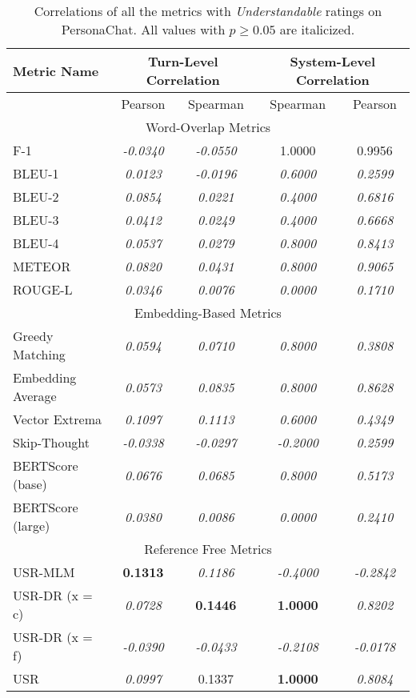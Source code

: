 \documentclass[11pt,a4paper]{article}
\begin{document}
\begin{table*}
    \centering
    \renewcommand*{\arraystretch}{1.2}
    \begin{tabular}{|l|c|c|c|c|}
    \hline
        \textbf{Metric Name} & \multicolumn{2}{|c|}{\textbf{Turn-Level Correlation}} & \multicolumn{2}{|c|}{\textbf{System-Level Correlation}}  \\ \hline
         & Pearson & Spearman & Spearman & Pearson \\ \hline
         \multicolumn{5}{|c|}{Word-Overlap Metrics} \\ \hline
F-1 & \textit{-0.0340} & \textit{-0.0550} & 1.0000 & 0.9956 \\
BLEU-1 & \textit{0.0123} & \textit{-0.0196} & \textit{0.6000} & \textit{0.2599} \\
BLEU-2 & \textit{0.0854} & \textit{0.0221} & \textit{0.4000} & \textit{0.6816} \\
BLEU-3 & \textit{0.0412} & \textit{0.0249} & \textit{0.4000} & \textit{0.6668} \\
BLEU-4 & \textit{0.0537} & \textit{0.0279} & \textit{0.8000} & \textit{0.8413} \\
METEOR & \textit{0.0820} & \textit{0.0431} & \textit{0.8000} & \textit{0.9065} \\
ROUGE-L & \textit{0.0346} & \textit{0.0076} & \textit{0.0000} & \textit{0.1710} \\\hline 
 \multicolumn{5}{|c|}{Embedding-Based Metrics} \\ \hline
Greedy Matching & \textit{0.0594} & \textit{0.0710} & \textit{0.8000} & \textit{0.3808} \\
Embedding Average & \textit{0.0573} & \textit{0.0835} & \textit{0.8000} & \textit{0.8628} \\
Vector Extrema & \textit{0.1097} & \textit{0.1113} & \textit{0.6000} & \textit{0.4349} \\
Skip-Thought & \textit{-0.0338} & \textit{-0.0297} & \textit{-0.2000} & \textit{0.2599} \\
BERTScore (base) & \textit{0.0676} & \textit{0.0685} & \textit{0.8000} & \textit{0.5173} \\
BERTScore (large) & \textit{0.0380} & \textit{0.0086} & \textit{0.0000} & \textit{0.2410} \\\hline 
 \multicolumn{5}{|c|}{Reference Free Metrics} \\ \hline
USR-MLM & \textbf{0.1313} & \textit{0.1186} & \textit{-0.4000} & \textit{-0.2842} \\
USR-DR (x = c) & \textit{0.0728} & \textbf{0.1446} & \textbf{1.0000} & \textit{0.8202} \\
USR-DR (x = f) & \textit{-0.0390} & \textit{-0.0433} & \textit{-0.2108} & \textit{-0.0178} \\
USR & \textit{0.0997} & 0.1337 & \textbf{1.0000} & \textit{0.8084} \\\hline
    \end{tabular}
    \caption{Correlations of all the metrics with \textit{Understandable} ratings on PersonaChat. All values with $p \geq 0.05$ are italicized.}
    
\end{table*}
\end{document}
